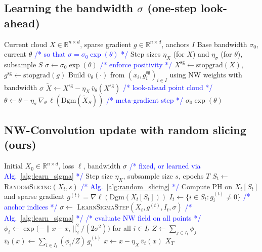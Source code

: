\documentclass{article} %
\newcommand{\R}{\mathbb{R}}
\newcommand{\Dgm}{\mathrm{Dgm}}
\theoremstyle{plain}
\theoremstyle{definition}
\theoremstyle{remark}
\newcommand{\cmt}[1]{\textcolor{blue}{\footnotesize\ttfamily /* #1 */}}
\begin{document}
\subsection{Learning the bandwidth $\sigma$ (one-step look-ahead)}
\label{app:learn_sigma}

\begin{algorithm}[H]
\caption{\textsc{LearnSigmaStep}: one-step look-ahead update for $\sigma$}
\label{alg:learn_sigma}
\begin{algorithmic}[1]
\Require Current cloud $X\in\R^{n\times d}$, sparse gradient $g\in\R^{n\times d}$, anchors $I$
\Require Base bandwidth $\sigma_0$, current $\theta$ \qquad \cmt{so that $\sigma=\sigma_0\exp(\theta)$}
\Require Step sizes $\eta_X$ (for $X$) and $\eta_\sigma$ (for $\theta$), subsample $S$ 
\State $\sigma \leftarrow \sigma_0\exp(\theta)$ \qquad \cmt{enforce positivity}
\State $X^{\mathrm{sg}}\leftarrow \mathrm{stopgrad}(X)$, $g^{\mathrm{sg}}\leftarrow \mathrm{stopgrad}(g)$ 
\State Build $\bar v_\theta(\cdot)$ from $(x_i,g_i^{\mathrm{sg}})_{i\in I}$ using NW weights with bandwidth $\sigma$
\State $\tilde X \leftarrow X^{\mathrm{sg}} - \eta_X\,\bar v_\theta(X^{\mathrm{sg}})$ \qquad \cmt{look-ahead point cloud}
\State $\theta \leftarrow \theta - \eta_\sigma\, \nabla_\theta \,\ell(\Dgm(\tilde X_{S}))$ \qquad \cmt{meta-gradient step}
\State \Return $\sigma_0\exp(\theta)$
\end{algorithmic}
\end{algorithm}

\subsection{NW-Convolution update with random slicing (ours)}
\label{app:nw_algo}

\begin{algorithm}[H]
\caption{NW-Convolution smoothing with random slicing (ours)}
\label{alg:nw_random_slicing}
\begin{algorithmic}[1]
\Require Initial $X_0\in\R^{n\times d}$, loss $\ell$, bandwidth $\sigma$ \cmt{fixed, or learned via Alg.~\ref{alg:learn_sigma}}
\Require Step size $\eta_X$, subsample size $s$, epochs $T$
    \State $S_t \leftarrow$ \textsc{RandomSlicing}$(X_t,s)$ \cmt{Alg.~\ref{alg:random_slicing}}
    \State Compute PH on $X_t[S_t]$ and sparse gradient $g^{(t)}=\nabla \ell(\Dgm(X_t[S_t]))$ %
    \State $I_t \leftarrow \{i\in S_t : g_i^{(t)}\neq 0\}$ \qquad \cmt{anchor indices}
        \State $\sigma \leftarrow$ \textsc{LearnSigmaStep}$(X_t,g^{(t)},I_t,\sigma)$ \qquad \cmt{Alg.~\ref{alg:learn_sigma}}
    \EndIf
     \qquad \cmt{evaluate NW field on all points}
        \State $\phi_i \leftarrow \exp\!\big(-\|x-x_i\|_2^2/(2\sigma^2)\big)$ for all $i\in I_t$
        \State $Z \leftarrow \sum_{j\in I_t} \phi_j$
        \State $\bar v_t(x) \leftarrow \sum_{i\in I_t} (\phi_i/Z)\, g_i^{(t)}$
        \State $x \leftarrow x - \eta_X\, \bar v_t(x)$ %
    \EndFor
\EndFor
\State \Return $X_T$
\end{algorithmic}
\end{algorithm}
\clearpage
\end{document}
